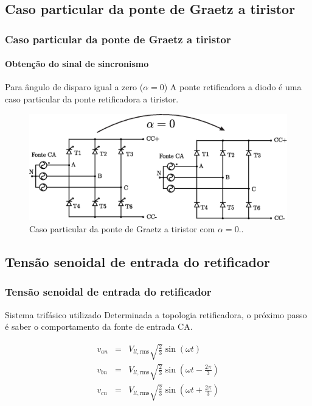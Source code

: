 \documentclass[aspectratio=43]{beamer}
\begin{document}
\subsection{Caso particular da ponte de Graetz a tiristor}
\begin{frame}
	\frametitle{Caso particular da ponte de Graetz a tiristor}
	\framesubtitle{Obtenção do sinal de sincronismo}
	\begin{block}{Para ângulo de disparo igual a zero ($\alpha =0$)}
	A ponte retificadora a diodo é uma caso particular da ponte retificadora a tiristor.
	\end{block}
	\begin{figure}[!h]
		\centering
		\includegraphics[width=0.85\linewidth]{figuras/TiristorCasoParticular.eps}
		\caption{Caso particular da ponte de Graetz a tiristor com $\alpha =0.$.}
	\end{figure}	
\end{frame}



\subsection{Tensão senoidal de entrada do retificador}
\begin{frame}
	\frametitle{Tensão senoidal de entrada do retificador}
	\begin{block}{Sistema trifásico utilizado}
		Determinada a topologia retificadora, o próximo passo é saber o comportamento da fonte de entrada CA.
	\end{block}


\begin{eqnarray}
{v_{an}} &=& {V_{ll,{\textrm{rms}}}}\sqrt {\frac{2}{3}} \sin \left( {\omega t} \right)\\
{v_{bn}} &=& {V_{ll,{\textrm{rms}}}}\sqrt {\frac{2}{3}} \sin \left( {\omega t - \frac{{2\pi }}{3}} \right)\\
{v_{cn}} &=& {V_{ll,{\textrm{rms}}}}\sqrt {\frac{2}{3}} \sin \left( {\omega t + \frac{{2\pi }}{3}} \right)
\end{eqnarray}	
\end{frame}
\end{document}
